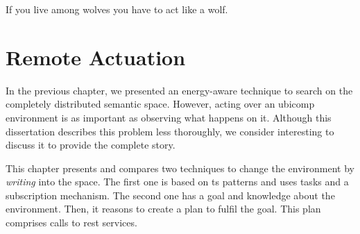 
\begin{savequote}[50mm]
If you live among wolves you have to act like a wolf.
\end{savequote}


\chapter{Remote Actuation}
\label{cha:actuate}


\newcommand{\restdesc}{\emph{RESTdesc}}



\ifpdf
    \graphicspath{{\pathchapsix/figures/PNG/}{\pathchapsix/figures/PDF/}{\pathchapsix/figures/JPG/}{\pathchapsix/figures/}}
\else
    \graphicspath{{\pathchapsix/figures/EPS/}{\pathchapsix/figures/}}
\fi



In the previous chapter, we presented an energy-aware technique to search on the completely distributed semantic space.
However, acting over an \ac{ubicomp} environment is as important as observing what happens on it. %
Although this dissertation describes this problem less thoroughly, we consider interesting to discuss it to provide the complete story. %

This chapter presents and compares two techniques to change the environment by \emph{writing} into the space. %
The first one is based on \ac{ts} patterns and uses tasks and a subscription mechanism.
The second one has a goal and knowledge about the environment.
Then, it reasons to create a plan to fulfil the goal.
This plan comprises calls to \ac{rest} services.








